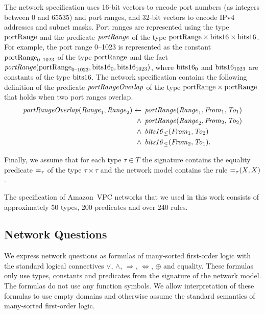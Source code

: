 The network specification uses 16-bit vectors to encode port numbers (as integers between 0 and 65535) and port ranges, and 32-bit vectors to encode IPv4 addresses and subnet masks. Port ranges are represented using the type $\mathrm{portRange}$ and the predicate $\mathit{portRange}$ of the type $\mathrm{portRange}\times\mathrm{bits16}\times\mathrm{bits16}$. For example, the port range 0--1023 is represented as the constant $\mathrm{portRange}_\text{0--1023}$ of the type $\mathrm{portRange}$ and the fact $\mathit{portRange}(\mathrm{portRange}_\text{0--1023},\allowbreak\mathrm{bits16}_0,\allowbreak\mathrm{bits16}_{1023})$, where $\mathrm{bits16}_0$ and $\mathrm{bits16}_{1023}$ are constants of the type $\mathrm{bits16}$. The network specification contains the following definition of the predicate $\mathit{portRangeOverlap}$ of the type $\mathrm{portRange}\times\mathrm{portRange}$ that holds when two port ranges overlap.
\begin{equation*}
  \begin{aligned}
\mathit{portRangeOverlap}(\mathit{Range}_1,\mathit{Range}_2)\leftarrow\:&\:\mathit{portRange}(\mathit{Range}_1,\mathit{From}_1,\mathit{To}_1) \\
  \wedge\:&\:\mathit{portRange}(\mathit{Range}_2,\mathit{From}_2,\mathit{To}_2) \\
  \wedge\:&\:\mathit{bits16}_\le(\mathit{From}_1,\mathit{To}_2) \\
  \wedge\:&\:\mathit{bits16}_\le(\mathit{From}_2,\mathit{To}_1).
  \end{aligned}
\end{equation*}

Finally, we assume that for each type $\tau\in T$ the signature contains the equality predicate $\mathit{=}_\tau$ of the type $\tau\times\tau$ and the network model contains the rule $\mathit{=}_\tau(X,X)$.

The specification of Amazon~VPC networks that we used in this work consists of approximately 50 types, 200 predicates and over 240 rules.


\subsection{Network Questions}
\label{sect:aws/reachability/properties}

We express network questions as formulas of many-sorted first-order logic with the standard logical connectives $\vee$, $\wedge$, $\Rightarrow$, $\Leftrightarrow$, $\oplus$ and equality. These formulas only use types, constants and predicates from the signature of the network model. The formulas do not use any function symbols. We allow interpretation of these formulas to use empty domains and otherwise assume the standard semantics of many-sorted first-order logic.

